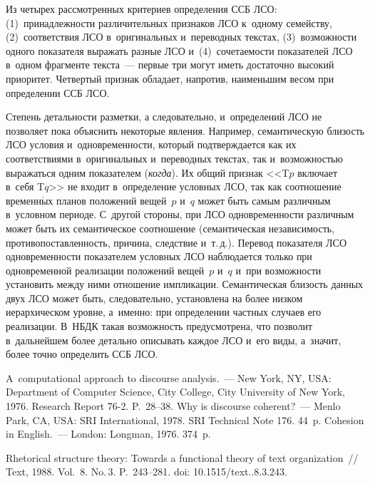 \begin{multicols}{2}
  Из четырех рассмотренных критериев определения ССБ ЛСО: 
(1)~принадлежности различительных признаков ЛСО к~одному семейству, 
(2)~соответствия ЛСО в~оригинальных и~переводных \mbox{текс\-тах}, (3)~возможности 
одного показателя выражать разные ЛСО и~(4)~сочетаемости показателей ЛСО 
в~одном фрагменте текста~--- первые три могут иметь достаточно высокий 
приоритет. Четвертый признак обладает, напротив, наименьшим весом при 
определении ССБ ЛСО. 
  
  Степень детальности разметки, а следовательно, и~определений ЛСО не 
позволяет пока объяснить некоторые явления. Например, семантическую 
близость ЛСО условия и~одновременности, который подтверждается как их 
соответствиями в~оригинальных и~переводных текстах, так и~воз\-мож\-ностью 
выражаться одним показателем (\textit{когда}). Их общий признак <<T$p$ 
включает в~себя T$q$>> не входит в~определение условных ЛСО, так как 
соотношение временн$\acute{\mbox{ы}}$х планов положений вещей~$p$ и~$q$ может быть 
самым различным в~условном периоде. С~другой стороны, при ЛСО 
одновременности различным может быть их семантическое соотношение 
(семантическая независимость, противопоставленность, причина, следствие 
и~т.\,д.). Перевод показателя ЛСО одновременности показателем условных 
ЛСО наблюдается только при одновременной реализации положений 
вещей~$p$ и~$q$ и~при возможности установить между ними отношение 
импликации. Семантическая близость данных двух ЛСО может быть, 
следовательно, установлена на более низком иерархическом уровне, а~именно: 
при определении частных случаев его реализации. В~НБДК такая возможность 
предусмотрена, что позволит в~дальнейшем более детально описывать каждое 
ЛСО и~его виды, а~значит, более точно определить ССБ ЛСО.
{

}
  
{\small\frenchspacing
 {\baselineskip=10.6pt
 \begin{thebibliography}{99}
 A~computational approach to discourse analysis.~--- 
New York, NY, USA: Department of Computer Science, City College, City University of New 
York, 1976.  Research Report 76-2. P.~28--38.
 Why is discourse coherent?~--- Menlo Park, CA, 
USA: SRI International, 1978. SRI Technical Note 176. 44~p.
  Cohesion in English.~--- London: Longman, 1976. 374~p.


 Rhetorical structure theory: Towards a functional theory of 
text organization~// Text, 1988. Vol.~8. No.\,3. P.~243--281. doi: 10.1515/text..8.3.243.


\end{thebibliography}}}
\end{multicols}
